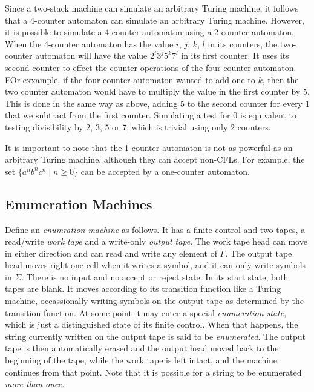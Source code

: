 Since a two-stack machine can simulate an arbitrary Turing machine, it follows that a 4-counter automaton can simulate an arbitrary Turing machine. However, it is possible to simulate a 4-counter automaton using a 2-counter automaton. When the 4-counter automaton has the value $i$, $j$, $k$, $l$ in its counters, the two-counter automaton will have the value $2^i3^j5^k7^l$ in its first counter. It uses its second counter to effect the counter operations of the four counter automaton. FOr exxample, if the four-counter automaton wanted to add one to $k$, then the two counter automaton would have to multiply the value in the first counter by $5$. This is done in the same way as above, adding $5$ to the second counter for every $1$ that we subtract from the first counter. Simulating a test for $0$ is equivalent to testing divisibility by 2, 3, 5 or 7; which is trivial using only 2 counters.

It is important to note that the 1-counter automaton is not as powerful as an arbitrary Turing machine, although they can accept non-CFLs. For example, the set $\{a^nb^nc^n\mid n\ge0\}$ can be accepted by a one-counter automaton.

\subsection{Enumeration Machines}
Define an \textit{enumration machine} as follows. It has a finite control and two tapes, a read/write \textit{work tape} and a write-only \textit{output tape}. The work tape head can move in either direction and can read and write any element of $\Gamma$. The output tape head moves right one cell when it writes a symbol, and it can only write symbols in $\Sigma$. There is no input and no accept or reject state. In its start state, both tapes are blank. It moves according to its transition function like a Turing machine, occassionally writing symbols on the output tape as determined by the transition function. At some point it may enter a special \textit{enumeration state}, which is just a distinguished state of its finite control. When that happens, the string currently written on the output tape is said to be \textit{enumerated}. The output tape is then automatically erased and the output head moved back to the beginning of the tape, while the work tape is left intact, and the machine continues from that point. Note that it is possible for a string to be enumerated \textit{more than once}.

